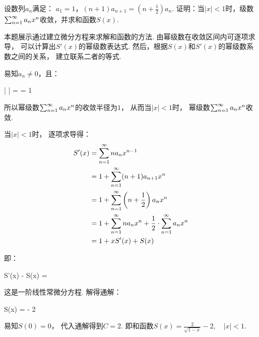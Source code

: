 \begin{example}
\label{ex:ch10-30}
设数列$a_n$满足：
        $a_1 = 1$，$(n+1)a_{n+1} = \left( n +\frac{1}{2} \right) a_n$.
        证明：当$|x|<1$时，级数$\ss a_n x^n$收敛，并求和函数$S(x)$.
\end{example}

\begin{analysis}
本题展示通过建立微分方程来求解和函数的方法.
        由幂级数在收敛区间内可逐项求导，
        可以计算出$S'(x)$的幂级数表达式.
        然后，根据$S(x)$和$S'(x)$的幂级数系数之间的关系，
        建立联系二者的等式.
\end{analysis}

\begin{solution}
易知$a_n \ne 0$，且：
        \begin{eq1}
            \limn \left|  \right|
            = \limn {}
            = 1
        \end{eq1}

        所以幂级数$\ss a_n x^n$的收敛半径为$1$，
        从而当$|x| < 1$时，
        幂级数$\ss a_n x^n$收敛.

        当$|x|<1$时，
        逐项求导得：
        \begin{align*}
            S'(x) &= \ss na_n x^{n-1} \\
            &= 1 + \ss (n+1)a_{n+1}x^n \\
            &= 1 + \ss \left( n + \frac{1}{2} \right)a_n x^n \\
            &= 1 + \ss na_n x^n +  \frac{1}{2} \cdot \ss a_n x^n \\
            &= 1 + xS'(x) + S(x)
        \end{align*}

        即：
        \begin{eq1}
            S'(x) - S(x) = 
        \end{eq1}

        这是一阶线性常微分方程.
        解得通解：
        \begin{eq1}
            S(x) =  - 2
        \end{eq1}

        易知$S(0)=0$，
        代入通解得到$C=2$.
        即和函数$S(x) = \frac{2}{\sqrt{1-x}} - 2,\quad |x|<1$.
\end{solution}
